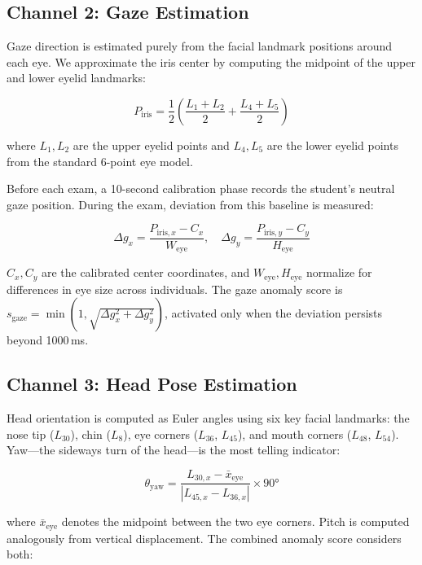 \documentclass[conference]{IEEEtran}
\begin{document}
\subsection{Channel 2: Gaze Estimation}

Gaze direction is estimated purely from the facial landmark positions around each eye. We approximate the iris center by computing the midpoint of the upper and lower eyelid landmarks:

\begin{equation}
    P_{\text{iris}} = \frac{1}{2}\left(\frac{L_1 + L_2}{2} + \frac{L_4 + L_5}{2}\right)
\end{equation}

where $L_1, L_2$ are the upper eyelid points and $L_4, L_5$ are the lower eyelid points from the standard 6-point eye model.

Before each exam, a 10-second calibration phase records the student's neutral gaze position. During the exam, deviation from this baseline is measured:

\begin{equation}
    \Delta g_x = \frac{P_{\text{iris},x} - C_x}{W_{\text{eye}}}, \quad \Delta g_y = \frac{P_{\text{iris},y} - C_y}{H_{\text{eye}}}
\end{equation}

$C_x, C_y$ are the calibrated center coordinates, and $W_{\text{eye}}, H_{\text{eye}}$ normalize for differences in eye size across individuals. The gaze anomaly score is $s_{\text{gaze}} = \min(1, \sqrt{\Delta g_x^2 + \Delta g_y^2})$, activated only when the deviation persists beyond 1000\,ms.

\subsection{Channel 3: Head Pose Estimation}

Head orientation is computed as Euler angles using six key facial landmarks: the nose tip ($L_{30}$), chin ($L_8$), eye corners ($L_{36}$, $L_{45}$), and mouth corners ($L_{48}$, $L_{54}$). Yaw---the sideways turn of the head---is the most telling indicator:

\begin{equation}
    \theta_{\text{yaw}} = \frac{L_{30,x} - \bar{x}_{\text{eye}}}{|L_{45,x} - L_{36,x}|} \times 90°
\end{equation}

where $\bar{x}_{\text{eye}}$ denotes the midpoint between the two eye corners. Pitch is computed analogously from vertical displacement. The combined anomaly score considers both:
\end{document}
